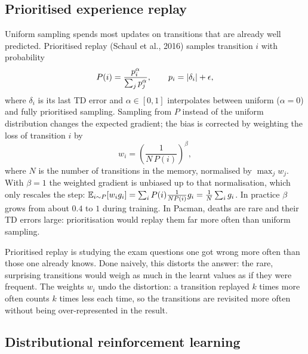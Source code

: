 \subsection{Prioritised experience replay}

Uniform sampling spends most updates on transitions that are already well
predicted. Prioritised replay (Schaul et al., 2016) samples transition $i$
with probability
\begin{equation}
  P(i) = \frac{p_i^\alpha}{\sum_j p_j^\alpha}, \qquad p_i = \left\lvert \delta_i \right\rvert +
  \epsilon,
\end{equation}
where $\delta_i$ is its last TD error and $\alpha \in [0, 1]$ interpolates
between uniform ($\alpha = 0$) and fully prioritised sampling. Sampling
from $P$ instead of the uniform distribution changes the expected
gradient; the bias is corrected by weighting the loss of transition $i$ by
\begin{equation}
  w_i = \left( \frac{1}{N\, P(i)} \right)^\beta,
\end{equation}
where $N$ is the number of transitions in the memory, normalised by
$\max_j w_j$. With $\beta = 1$ the weighted gradient is unbiased up to that
normalisation, which only rescales the step: $\mathbb{E}_{i \sim P}[w_i g_i] = \sum_i
P(i) \frac{1}{N P(i)} g_i = \frac{1}{N} \sum_i g_i$. In practice $\beta$ grows
from about $0.4$ to $1$
during training. In Pacman, deaths are rare and their TD errors large:
prioritisation would replay them far more often than uniform sampling.

\begin{intuition}
  Prioritised replay is studying the exam questions one got wrong more
  often than those one already knows. Done naively, this distorts the
  answer: the rare, surprising transitions would weigh as much in the
  learnt values as if they were frequent. The weights $w_i$ undo the
  distortion: a transition replayed $k$ times more often counts $k$ times
  less each time, so the transitions are revisited more often without
  being over-represented in the result.
\end{intuition}

\subsection{Distributional reinforcement learning}

